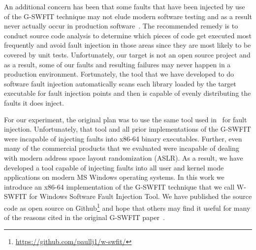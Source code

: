 An additional concern has been that some faults that have been injected by use
of the G-SWFIT technique may not elude modern software testing and as a result
never actually occur in production software~\cite{natella2010}.  The
recommended remedy is to conduct source code analysis to determine which
pieces of code get executed most frequently and avoid fault injection in those
areas since they are most likely to be covered by unit tests.  Unfortunately,
our target is not an open source project and as a result, some of our faults
and resulting failures may never happen in a production environment.
Fortunately, the tool that we have developed to do software fault injection
automatically scans each library loaded by the target executable for fault
injection points and then is capable of evenly distributing the faults it does
inject.

For our experiment, the original plan was to use the same tool used
in~\cite{irrera2015} for fault injection.  Unfortunately, that tool and all
prior implementations of the G-SWFIT were incapable of injecting faults into
x86-64 binary executables.  Further, even many of the commercial products that
we evaluated were incapable of dealing with modern address space layout
randomization (ASLR).  As a result, we have developed a tool capable of
injecting faults into all user and kernel mode applications on modern MS
Windows operating systems.  In this work we introduce an x86-64 implementation
of the G-SWFIT technique that we call W-SWFIT for Windows Software Fault
Injection Tool.  We have published the source code as open source on
Github\footnote{\url{https://github.com/paullj1/w-swfit/}} and hope that others
may find it useful for many of the reasons cited in the original G-SWFIT
paper~\cite{gswfit}.


